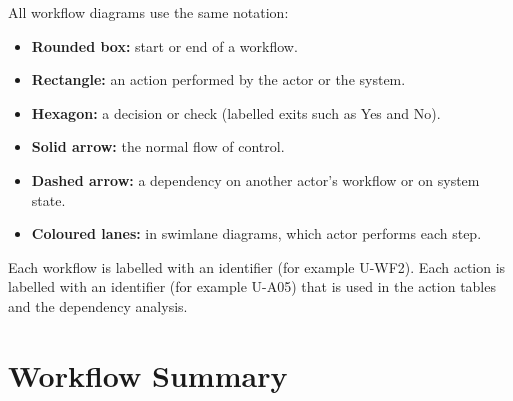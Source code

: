 All workflow diagrams use the same notation:

\begin{itemize}
  \item \textbf{Rounded box:} start or end of a workflow.
  \item \textbf{Rectangle:} an action performed by the actor or the system.
  \item \textbf{Hexagon:} a decision or check (labelled exits such as Yes and No).
  \item \textbf{Solid arrow:} the normal flow of control.
  \item \textbf{Dashed arrow:} a dependency on another actor's workflow or on system state.
  \item \textbf{Coloured lanes:} in swimlane diagrams, which actor performs each step.
\end{itemize}

Each workflow is labelled with an identifier (for example U-WF2). Each action is labelled with an identifier (for example U-A05) that is used in the action tables and the dependency analysis.

\section{Workflow Summary}


